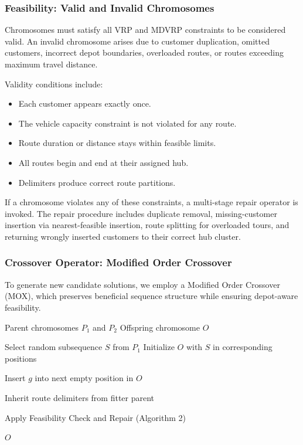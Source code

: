 \documentclass[conference]{IEEEtran}
\begin{document}
\subsubsection{Feasibility: Valid and Invalid Chromosomes}

Chromosomes must satisfy all VRP and MDVRP constraints to be considered valid. An invalid chromosome arises due to customer duplication, omitted customers, incorrect depot boundaries, overloaded routes, or routes exceeding maximum travel distance.

Validity conditions include:
\begin{itemize}
  \item Each customer appears exactly once.
  \item The vehicle capacity constraint is not violated for any route.
  \item Route duration or distance stays within feasible limits.
  \item All routes begin and end at their assigned hub.
  \item Delimiters produce correct route partitions.
\end{itemize}

If a chromosome violates any of these constraints, a multi-stage repair operator is invoked. The repair procedure includes duplicate removal, missing-customer insertion via nearest-feasible insertion, route splitting for overloaded tours, and returning wrongly inserted customers to their correct hub cluster.

\subsubsection{Crossover Operator: Modified Order Crossover}

To generate new candidate solutions, we employ a Modified Order Crossover (MOX), which preserves beneficial sequence structure while ensuring depot-aware feasibility.

\begin{algorithm}[htbp]
\caption{Modified Order Crossover (MOX)}
\begin{algorithmic}[1]
\REQUIRE Parent chromosomes $P_1$ and $P_2$
\ENSURE Offspring chromosome $O$

\STATE Select random subsequence $S$ from $P_1$ 
\STATE Initialize $O$ with $S$ in corresponding positions

        \STATE Insert $g$ into next empty position in $O$
    \ENDIF
\ENDFOR

\STATE Inherit route delimiters from fitter parent

\STATE Apply Feasibility Check and Repair (Algorithm 2)

\RETURN $O$
\end{algorithmic}
\end{algorithm}
\end{document}
